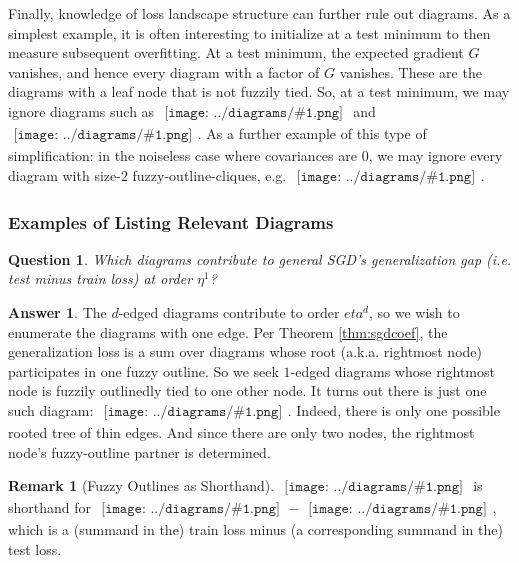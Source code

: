 \documentclass{article}
\theoremstyle{plain}
\newtheorem*{quest*}{Question}
\theoremstyle{definition}
\newtheorem*{answ*}{Answer}
\newtheorem*{rmk*}{Remark}
\newcommand{\sdia}[1]{\begin{gathered}\texttt{[image: ../diagrams/\#1.png]}\end{gathered}}
\begin{document}
            Finally, knowledge of loss landscape structure can further rule
            out diagrams.  As a simplest example, it is often interesting to
            initialize at a test minimum to then measure subsequent
            overfitting.  At a test minimum, the expected gradient $G$
            vanishes, and hence every diagram with a factor of $G$ vanishes.
            These are the diagrams with a leaf node that is not fuzzily tied. 
            So, at a test minimum, we may ignore diagrams such as
            $\sdia{(0-12)(02-12)}$
            and
            $\sdia{(01-2-3)(02-12-23)}$.
            As a further example of this type of simplification: in the
            noiseless case where covariances are $0$, we may ignore every
            diagram with size-$2$ fuzzy-outline-cliques, e.g.
            $\sdia{(0-12-3)(01-12-23)}$.

        \subsubsection*{Examples of Listing Relevant Diagrams}
            \begin{quest*}
                Which diagrams contribute to general SGD's generalization gap
                (i.e. test minus train loss) at order $\eta^1$?
            \end{quest*}
            \begin{answ*}
                The $d$-edged diagrams contribute to order $eta^d$, so we wish
                to enumerate the diagrams with one edge.  Per Theorem
                \ref{thm:sgdcoef}, the generalization loss is a sum over
                diagrams whose root (a.k.a.  rightmost node) participates in
                one fuzzy outline.  So we seek $1$-edged diagrams whose
                rightmost node is fuzzily outlinedly tied to one other node.
                It turns out there is just one such diagram:
                $\sdia{c(01)(01)}$.  Indeed, there is only one possible rooted
                tree of thin edges.  And since there are only two nodes, the
                rightmost node's fuzzy-outline partner is determined.
            \end{answ*}
            \begin{rmk*}[Fuzzy Outlines as Shorthand]
                $\sdia{c(01)(01)}$ is shorthand for $\sdia{(01)(01)} -
                \sdia{(0-1)(01)}$, which is a (summand in the) train loss minus
                (a corresponding summand in the) test loss.    
            \end{rmk*}
\end{document}
